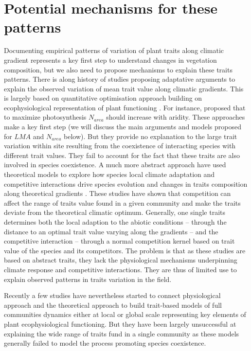 \documentclass[a4paper,11pt]{article}
\begin{document}
\clearpage

\section{Potential mechanisms for these patterns}

Documenting empirical patterns of variation of plant traits along climatic gradient represents a key first step to understand changes in vegetation composition, but we also need to propose mechanisms to explain these traits patterns. There is along history of studies proposing adaptative arguments to explain the observed variation of mean trait value along climatic gradients. This is largely based on quantitative optimisation approach building on ecophysiological representation of plant functioning \citep{Makela-2002}. For instance, \citet{Wright-2003} proposed that to maximize photosynthesis $N_{area}$ should increase with aridity. These approaches make a key first step (we will discuss the main arguments and models proposed for $LMA$ and $N_{area}$ below). But they provide no explanation to the large trait variation within site resulting from the coexistence of interacting species with different trait values. They fail to account for the fact that these traits are also involved in species coexistence. A much more abstract approach have used theoretical models to explore how species local climate adaptation and competitive interactions drive species evolution and changes in traits composition along theoretical gradients \citep{Case-2000,Doebeli-2003,Goldberg-2006,Leimar-2008}. These studies have shown that competition can affect the range of traits value found in a given community and make the traits deviate from the theoretical climatic optimum.  Generally, one single traits determines both the local adaption to the abiotic conditions -- through the distance to an optimal trait value varying along the gradients -- and the competitive interaction -- through a normal competition kernel based on trait value of the species and its competitors\citep[see][]{Case-2000}. The problem is that as these studies are based on abstract traits, they lack the physiological mechanisms underpinning climate response and competitive interactions. They are thus of limited use to explain observed patterns in traits variation in the field.  

Recently a few studies have nevertheless started to connect physiological approach and the theoretical approach to build trait-based models of full communities dynamics either at local \citep{Farrior-2013} or global scale \citep[see][]{Sakschewski-2015,Scheiter-2013} representing key elements of plant ecophysiological functioning. But they have been largely unsuccessful at explaining the wide range of traits fund in a single community as these models generally failed to model the process promoting species coexistence.
\end{document}
